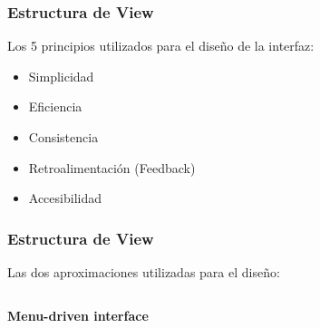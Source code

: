 \documentclass[14pt]{beamer}
\begin{document}
\begin{frame}
\frametitle{Estructura de View}
Los 5 principios utilizados para el diseño de la interfaz:
\begin{itemize}
\item Simplicidad
\item Eficiencia
\item Consistencia
\item Retroalimentación (Feedback)
\item Accesibilidad
\end{itemize}

\end{frame}

\begin{frame}
\frametitle{Estructura de View}
Las dos aproximaciones utilizadas para el diseño:

\begin{columns}
\begin{column}{0.5\textwidth}
\textbf{Menu-driven interface}
\begin{center}


\end{center}
\end{column}
\end{columns}
\end{frame}
\end{document}
